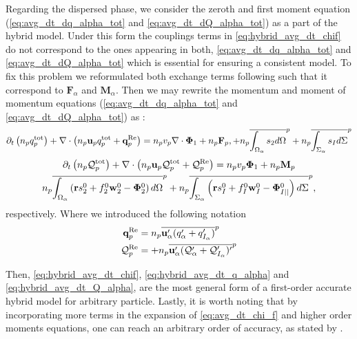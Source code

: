 Regarding the dispersed phase, we consider the zeroth and first moment equation (\ref{eq:avg_dt_dq_alpha_tot} and \ref{eq:avg_dt_dQ_alpha_tot}) as  a part of the hybrid model.
Under this form the couplings terms in \ref{eq:hybrid_avg_dt_chif} do not correspond to the ones appearing in both, \ref{eq:avg_dt_dq_alpha_tot} and \ref{eq:avg_dt_dQ_alpha_tot} which is essential for ensuring a consistent model. 
To fix this problem we reformulated both exchange terms following \citet{zhang1997momentum} such that it correspond to $\mathbf{F}_\alpha$ and $\textbf{M}_\alpha$. 
Then we may rewrite the momentum and moment of momentum equations (\ref{eq:avg_dt_dq_alpha_tot} and \ref{eq:avg_dt_dQ_alpha_tot}) as : 
\begin{multline}
    \partial_t \left(n_p q_p^\text{tot}\right)
    + \mathbf{\nabla}\cdot \left(n_p\textbf{u}_p
    q_p^\text{tot} + 
    \textbf{q}_p^\text{Re}
    \right)
    = 
    n_p v_p  \mathbf{\nabla}\cdot \mathbf{\Phi}_1 
    + n_p \textbf{F}_p,
    + n_p\overline{\int_{\Omega_\alpha} s_2 d\Omega}^{p}
    + n_p\overline{\int_{\Sigma_\alpha} s_I d\Sigma}^{p}
    \label{eq:hybrid_avg_dt_q_alpha}
\end{multline}
\begin{multline}
    \partial_t \left(n_p \mathcal{Q}_p^\text{tot}\right)
    + \mathbf{\nabla}\cdot \left(
        n_p \textbf{u}_p \mathcal{Q}_p^\text{tot}
    + \mathcal{Q}_p^\text{Re}
    \right)
    =
    n_p v_p \mathbf{\Phi}_1 
    + n_p \textbf{M}_p\\
    n_p\overline{\int_{\Omega_\alpha} \left(
        \textbf{r} s_2^0         
        + f_2^0  \textbf{w}_2^0 
        - \mathbf{\Phi}_2^0
        \right) d\Omega}^{p}
        + n_p\overline{\int_{\Sigma_\alpha} \left(
        \textbf{r}s_I^0
        + f_I^0 \textbf{w}_I^0
        - \mathbf{\Phi}_{I||}^0
    \right) d\Sigma}^{p},
    \label{eq:hybrid_avg_dt_Q_alpha}
\end{multline}
respectively. 
Where  we introduced the following notation
\begin{align*}
    \textbf{q}_p^\text{Re}
    &= 
    n_p\overline{\textbf{u}_\alpha'(q_\alpha'+q_{I_\alpha}')}^{p} \\
    \mathcal{Q}_p^\text{Re}
    &= 
    + n_p\overline{\textbf{u}_\alpha'(\mathcal{Q}_\alpha'+\mathcal{Q}_{I_\alpha}')'}^{p}
\end{align*}

Then, \ref{eq:hybrid_avg_dt_chif}, \ref{eq:hybrid_avg_dt_q_alpha} and \ref{eq:hybrid_avg_dt_Q_alpha}, are the most general form of a first-order accurate hybrid model for arbitrary particle. 
Lastly, it is worth noting that by incorporating more terms in the expansion of \ref{eq:avg_dt_chi_f} and higher order moments equations, one can reach an arbitrary order of accuracy, as stated by \citet{zhang1997momentum}. 

